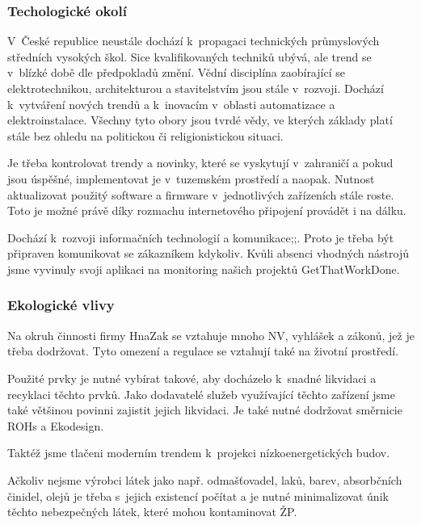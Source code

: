 \documentclass[a4paper, twoside, 11pt]{article}
\begin{document}
			\subsubsection{Techologické okolí}
				V~České republice neustále dochází k~propagaci technických průmyslových středních vysokých škol. Sice kvalifikovaných techniků ubývá, ale trend se v~blízké době dle předpokladů změní. Vědní disciplína zaobírající se elektrotechnikou, architekturou a stavitelstvím jsou stále v~rozvoji. Dochází k~vytváření nových trendů a k~inovacím v~oblasti automatizace a elektroinstalace. Všechny tyto obory jsou tvrdé vědy, ve kterých základy platí stále bez ohledu na politickou či religionistickou situaci.\par
				Je třeba kontrolovat trendy a novinky, které se vyskytují v~zahraničí a pokud jsou úspěšné, implementovat je v~tuzemském prostředí a naopak. Nutnost aktualizovat použitý software a firmware v~jednotlivých zařízeních stále roste. Toto je možné právě díky rozmachu internetového připojení provádět i na dálku.\par
				Dochází k~rozvoji informačních technologií a komunikace;;. Proto je třeba být připraven komunikovat se zákazníkem kdykoliv. Kvůli absenci vhodných nástrojů jsme vyvinuly svoji aplikaci na monitoring našich projektů GetThatWorkDone.

			\subsubsection{Ekologické vlivy}
				Na okruh činnosti firmy HnaZak se vztahuje mnoho NV, vyhlášek a zákonů, jež je třeba dodržovat. Tyto omezení a regulace se vztahují také na životní prostředí.\par
				Použité prvky je nutné vybírat takové, aby docházelo k~snadné likvidaci a recyklaci těchto prvků. Jako dodavatelé služeb využívající těchto zařízení jsme také většinou povinni zajistit jejich likvidaci. Je také nutné dodržovat směrnicie ROHs a Ekodesign.\par
Taktéž jsme tlačeni moderním trendem k~projekci nízkoenergetických budov.\par
Ačkoliv nejsme výrobci látek jako např. odmašťovadel, laků, barev, absorbčních činidel, olejů je třeba s~jejich existencí počítat a je nutné minimalizovat únik těchto nebezpečných látek, které mohou kontaminovat ŽP.
\end{document}
